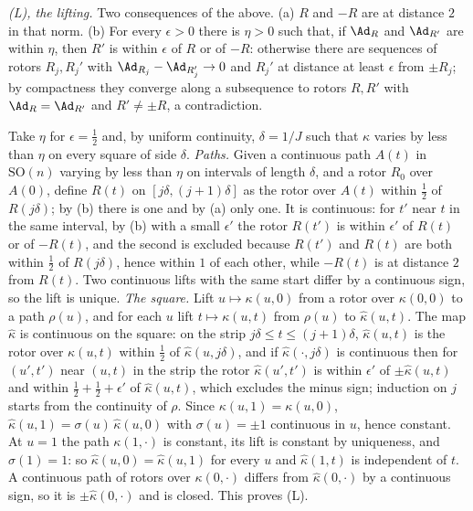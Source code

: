 \emph{(L), the lifting.} Two consequences of the above. (a) $R$ and $-R$ are at distance $2$ in that norm. (b) For every $\epsilon > 0$ there is $\eta > 0$ such that, if $\Ad_{R}$ and $\Ad_{R'}$ are within $\eta$, then $R'$ is within $\epsilon$ of $R$ or of $-R$: otherwise there are sequences of rotors $R_{j}, R_{j}'$ with $\Ad_{R_{j}} - \Ad_{R_{j}'} \to 0$ and $R_{j}'$ at distance at least $\epsilon$ from $\pm R_{j}$; by compactness they converge along a subsequence to rotors $R, R'$ with $\Ad_{R} = \Ad_{R'}$ and $R' \neq \pm R$, a contradiction.

Take $\eta$ for $\epsilon = \tfrac12$ and, by uniform continuity, $\delta = 1/J$ such that $\kappa$ varies by less than $\eta$ on every square of side $\delta$. \emph{Paths.} Given a continuous path $A(t)$ in $\mathrm{SO}(n)$ varying by less than $\eta$ on intervals of length $\delta$, and a rotor $R_{0}$ over $A(0)$, define $R(t)$ on $[j\delta, (j+1)\delta]$ as the rotor over $A(t)$ within $\tfrac12$ of $R(j\delta)$; by (b) there is one and by (a) only one. It is continuous: for $t'$ near $t$ in the same interval, by (b) with a small $\epsilon'$ the rotor $R(t')$ is within $\epsilon'$ of $R(t)$ or of $-R(t)$, and the second is excluded because $R(t')$ and $R(t)$ are both within $\tfrac12$ of $R(j\delta)$, hence within $1$ of each other, while $-R(t)$ is at distance $2$ from $R(t)$. Two continuous lifts with the same start differ by a continuous sign, so the lift is unique. \emph{The square.} Lift $u \mapsto \kappa(u,0)$ from a rotor over $\kappa(0,0)$ to a path $\rho(u)$, and for each $u$ lift $t \mapsto \kappa(u,t)$ from $\rho(u)$ to $\hat\kappa(u,t)$. The map $\hat\kappa$ is continuous on the square: on the strip $j\delta \leq t \leq (j+1)\delta$, $\hat\kappa(u,t)$ is the rotor over $\kappa(u,t)$ within $\tfrac12$ of $\hat\kappa(u,j\delta)$, and if $\hat\kappa(\cdot, j\delta)$ is continuous then for $(u',t')$ near $(u,t)$ in the strip the rotor $\hat\kappa(u',t')$ is within $\epsilon'$ of $\pm\hat\kappa(u,t)$ and within $\tfrac12 + \tfrac12 + \epsilon'$ of $\hat\kappa(u,t)$, which excludes the minus sign; induction on $j$ starts from the continuity of $\rho$. Since $\kappa(u,1) = \kappa(u,0)$, $\hat\kappa(u,1) = \sigma(u)\,\hat\kappa(u,0)$ with $\sigma(u) = \pm 1$ continuous in $u$, hence constant. At $u = 1$ the path $\kappa(1,\cdot)$ is constant, its lift is constant by uniqueness, and $\sigma(1) = 1$: so $\hat\kappa(u,0) = \hat\kappa(u,1)$ for every $u$ and $\hat\kappa(1,t)$ is independent of $t$. A continuous path of rotors over $\kappa(0,\cdot)$ differs from $\hat\kappa(0,\cdot)$ by a continuous sign, so it is $\pm\hat\kappa(0,\cdot)$ and is closed. This proves (L).

